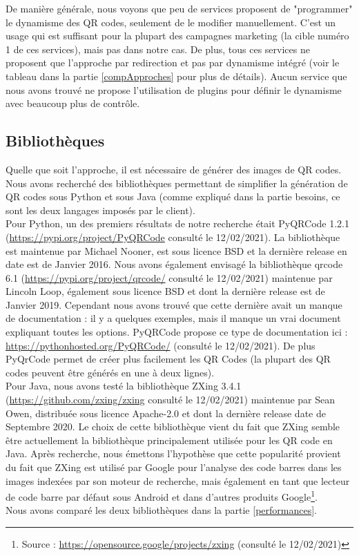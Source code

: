 \documentclass[a4paper,12pt]{article}
\begin{document}
\noindent
De manière générale, nous voyons que peu de services proposent de "programmer" le dynamisme des QR codes, seulement de le modifier manuellement. C'est un usage qui est suffisant pour la plupart des campagnes marketing (la cible numéro 1 de ces services), mais pas dans notre cas. De plus, tous ces services ne proposent que l'approche par redirection et pas par dynamisme intégré (voir le tableau dans la partie \ref{compApproches} pour plus de détails). Aucun service que nous avons trouvé ne propose l'utilisation de plugins pour définir le dynamisme avec beaucoup plus de contrôle.
\subsection{Bibliothèques}
\noindent Quelle que soit l’approche, il est nécessaire de générer des images de QR codes. Nous avons recherché des bibliothèques permettant de simplifier la génération de QR codes sous Python et sous Java (comme expliqué dans la partie besoins, ce sont les deux langages imposés par le client).\\
Pour Python, un des premiers résultats de notre recherche était PyQRCode 1.2.1 (\url{https://pypi.org/project/PyQRCode} consulté le 12/02/2021). La bibliothèque est maintenue par Michael Nooner, est sous licence BSD et la dernière release en date est de Janvier 2016. Nous avons également envisagé la bibliothèque qrcode 6.1 (\url{https://pypi.org/project/qrcode/} consulté le 12/02/2021) maintenue par Lincoln Loop, également sous licence BSD et dont la dernière release est de Janvier 2019. Cependant nous avons trouvé que cette dernière avait un manque de documentation : il y a quelques exemples, mais il manque un vrai document expliquant toutes les options. PyQRCode propose ce type de documentation ici : \url{https://pythonhosted.org/PyQRCode/} (consulté le 12/02/2021). De plus PyQrCode permet de créer plus facilement les QR Codes (la plupart des QR codes peuvent être générés en une à deux lignes).\\
\noindent
Pour Java, nous avons testé la bibliothèque ZXing 3.4.1 (\url{https://github.com/zxing/zxing} consulté le 12/02/2021) maintenue par Sean Owen, distribuée sous licence Apache-2.0 et dont la dernière release date de Septembre 2020. Le choix de cette bibliothèque vient du fait que ZXing semble être actuellement la bibliothèque principalement utilisée pour les QR code en Java. Après recherche, nous émettons l'hypothèse que cette popularité provient du fait que ZXing est utilisé par Google pour l'analyse des code barres dans les images indexées par son moteur de recherche, mais également en tant que lecteur de code barre par défaut sous Android et dans d'autres produits Google\footnote{Source : \url{https://opensource.google/projects/zxing} (consulté le 12/02/2021)}.\\
\noindent
Nous avons comparé les deux bibliothèques dans la partie \ref{performances}.\\
\end{document}
